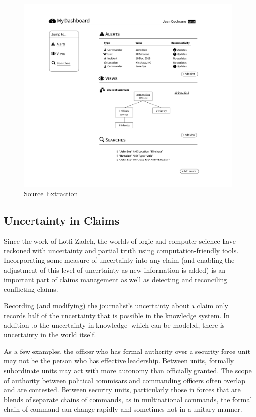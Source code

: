 \documentclass[format=siggraph, review=true]{acmart}
\begin{document}
\begin{figure}[h]
\includegraphics[width=\columnwidth]{images/sketches/dashboard.png}
\caption{Source Extraction}
\label{fig:dashboard}
\end{figure}



\subsection{Uncertainty in Claims}
Since the work of Lotfi Zadeh, the worlds of logic
and computer science have reckoned with uncertainty and partial truth
using computation-friendly tools. Incorporating some measure of
uncertainty into any claim (and enabling the adjustment of this level
of uncertainty as new information is added) is an important part of
claims management as well as detecting and reconciling conflicting
claims.


Recording (and modifying) the journalist's uncertainty about a claim
only records half of the uncertainty that is possible in the
knowledge system. In addition to the uncertainty in knowledge,
which can be modeled, there is uncertainty in the world itself.

As a few examples, the officer who has formal authority over a
security force unit may not be the person who has effective
leadership. Between units, formally subordinate units may act with more
autonomy than officially granted. The scope of authority between
political commisars and commanding officers often overlap and are
contested. Between security units, particularly those in forces that
are blends of separate chains of commands, as in multinational
commands, the formal chain of command can change rapidly and sometimes
not in a unitary manner.
\end{document}
